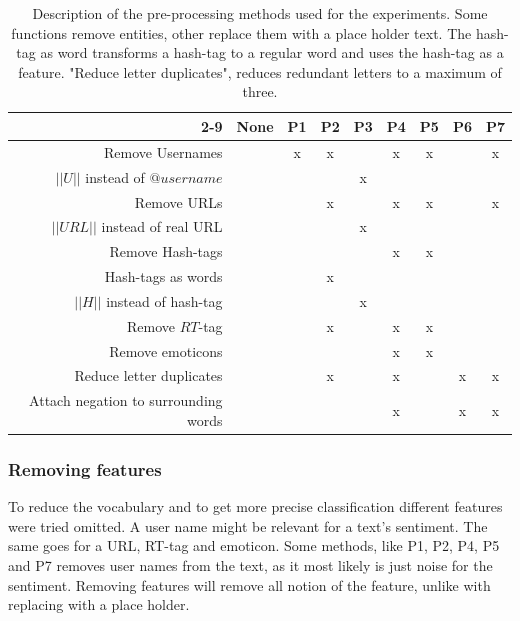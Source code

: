 \begin{table}[htb]
	\centering
	\begin{tabular}{|r||c|c|c|c|c|c|c|c|}

		\cline{2-9}
	 \multicolumn{1}{c| }{ } & \textbf{None} & \textbf{P1} & \textbf{P2} & \textbf{P3} & \textbf{P4} & \textbf{P5} & \textbf{P6} & \textbf{P7}  \\ \hline
		Remove Usernames                     & & x & x &   & x & x & & x \\ \hline
		$||U||$ instead of $@username$       & &   &   & x &   &   & & \\ \hline
		Remove URLs                          & &   & x &   & x & x & & x \\ \hline
		$||URL||$ instead of real URL        & &   &   & x &   &   & & \\ \hline
		Remove Hash-tags                     & &   &   &   & x & x & & \\ \hline
		Hash-tags as words                   & &   & x &   &   &   & & \\ \hline
		$||H||$ instead of hash-tag          & &   &   & x &   &   & & \\ \hline
		Remove $RT$-tag                      & &   & x &   & x & x & & \\ \hline
		Remove emoticons                     & &   &   &   & x & x & & \\ \hline
		Reduce letter duplicates             & &   & x &   & x &   & x & x \\ \hline
		Attach negation to surrounding words & &   &   &   & x &   & x & x \\ \hline
	\end{tabular}
	\caption[Description of used pre-processing methods]{Description of the pre-processing methods used for the experiments. Some functions remove entities, other replace them with a place holder text. The hash-tag as word transforms a hash-tag to a regular word and uses the hash-tag as a feature. "Reduce letter duplicates", reduces redundant letters to a maximum of three.}
	\label{tab:preproc_desc}
\end{table}

\subsubsection{Removing features}
To reduce the vocabulary and to get more precise classification different features were tried omitted. A user name might be relevant for a text's sentiment. The same goes for a URL, RT-tag and emoticon. Some methods, like P1, P2, P4, P5 and P7 removes user names from the text, as it most likely is just noise for the sentiment. Removing features will remove all notion of the feature, unlike with replacing with a place holder.

